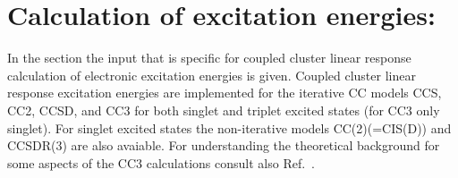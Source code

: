 
\section{Calculation of excitation energies: }\label{sec:ccexci}

In the  section the input that is
specific for coupled cluster linear response calculation of
electronic excitation energies is given. 
Coupled cluster linear response excitation energies 
are implemented for the iterative CC models CCS, CC2, CCSD, and CC3 for 
both singlet and triplet excited states (for CC3 only singlet).
For singlet excited states the non-iterative models CC(2)(=CIS(D)) and CCSDR(3)
are also avaiable.
For understanding the theoretical background for some
aspects of the CC3 calculations consult also Ref.\ \cite{Christiansen:JCP105,Hald:JCP113,Christiansen:JCP103}.

\begin{center}
\end{center}



